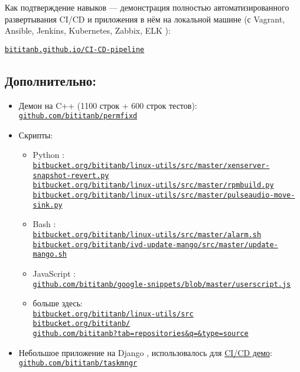 \documentclass[11pt, a4paper]{article}
\newcommand\rurl[1]{%
  \href{http://#1}{\nolinkurl{#1}}%
}
\newcommand\Eng[1]{%
  \foreignlanguage{english}{#1}%
}
\begin{document}
Как подтверждение навыков — демонстрация полностью автоматизированного развертывания \Eng{CI/CD} и приложения в нём на локальной машине (с \Eng{Vagrant, Ansible, Jenkins, Kubernetes, Zabbix, ELK}):

\rurl{bititanb.github.io/CI-CD-pipeline}

\subsection*{Дополнительно:}
\begin{itemize}
  \item Демон на \Eng{C++} (1100 строк + 600 строк тестов):\\
    \rurl{github.com/bititanb/permfixd}
  \item Скрипты:
    \begin{itemize}
      \item \Eng{Python}:\\
        \rurl{bitbucket.org/bititanb/linux-utils/src/master/xenserver-snapshot-revert.py}\\
        \rurl{bitbucket.org/bititanb/linux-utils/src/master/rpmbuild.py}\\
        \rurl{bitbucket.org/bititanb/linux-utils/src/master/pulseaudio-move-sink.py}
      \item \Eng{Bash}:\\
        \rurl{bitbucket.org/bititanb/linux-utils/src/master/alarm.sh}\\
        \rurl{bitbucket.org/bititanb/ivd-update-mango/src/master/update-mango.sh}
      \item \Eng{JavaScript}:\\
        \rurl{github.com/bititanb/google-snippets/blob/master/userscript.js}
      \item больше здесь:\\
        \rurl{bitbucket.org/bititanb/linux-utils/src}\\
        \rurl{bitbucket.org/bititanb/}\\
        \rurl{github.com/bititanb?tab=repositories&q=&type=source}
    \end{itemize}
  \item Небольшое приложение на \Eng{Django}, использовалось для \href{https://github.com/bititanb/CI-CD-pipeline}{\Eng{CI/CD} демо}:\\
    \rurl{github.com/bititanb/taskmngr}
\end{itemize}
\end{document}
